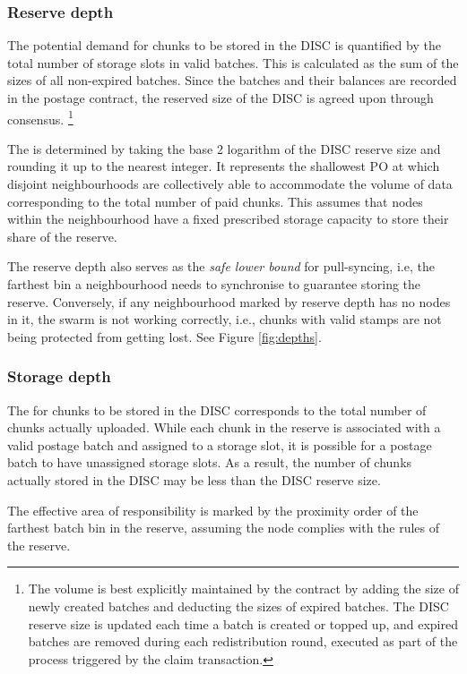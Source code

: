 \subsubsection{Reserve depth}

The potential demand for chunks to be stored in the DISC is quantified by the total number of storage slots in valid batches. This is calculated as the sum of the sizes of all non-expired batches. Since the batches and their balances are recorded in the postage contract, the reserved size of the DISC is agreed upon through consensus.%
%
\footnote{The volume is best explicitly maintained by the contract by adding the size of newly created batches and deducting the sizes of expired batches. The DISC reserve size is updated each time a batch is created or topped up, and expired batches are removed during each redistribution round, executed as part of the process triggered by the claim transaction.}  

The  is determined by taking the base 2 logarithm of the DISC reserve size and rounding it up to the nearest integer. It represents the shallowest PO at which disjoint neighbourhoods are collectively able to accommodate the volume of data corresponding to the total number of paid chunks. This assumes that nodes within the neighbourhood have a fixed prescribed storage capacity to store their share of the reserve. 

The reserve depth also serves as the \emph{safe lower bound} for pull-syncing, i.e, the farthest bin a neighbourhood needs to synchronise to guarantee storing the reserve.
Conversely, if any neighbourhood marked by reserve depth has no nodes in it, the swarm is not working correctly, i.e., chunks with valid stamps are not being protected from getting lost. See Figure \ref{fig:depths}.

\subsubsection{Storage depth}

The  for chunks to be stored in the DISC corresponds to the total number of chunks actually uploaded. While each chunk in the reserve is associated with a valid postage batch and assigned to a storage slot, it is possible for a postage batch to have unassigned storage slots. As a result, the number of chunks actually stored in the DISC may be less than the DISC reserve size. 

The effective area of responsibility is  marked by the proximity order of the farthest batch bin in the reserve, assuming the node complies with the rules of the reserve. 

